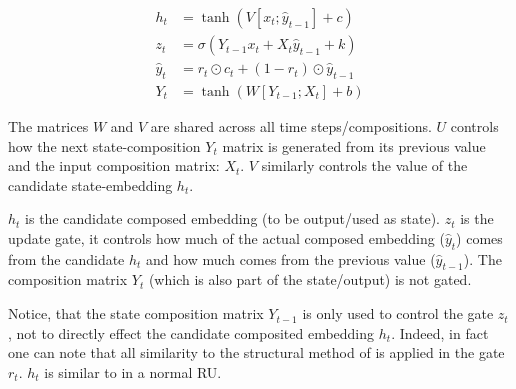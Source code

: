 \documentclass[12pt,parskip]{komatufte}
\begin{document}

 
\begin{align}
h_t &= \tanh\left(V[x_t; \hat{y}_{t-1}] + c \right)\\
z_t &= \sigma\left(Y_{t-1}x_t + X_t \hat{y}_{t-1} + k \right)\\
%
\hat{y}_t &= r_t \odot c_t + (1-r_t) \odot \hat{y}_{t-1} \\
Y_t &= \tanh \left( W[Y_{t-1}; X_t] + b \right)
\end{align}



The matrices $W$ and $V$ are shared across all time steps/compositions.
$U$ controls how the next state-composition $Y_t$ matrix is generated from its previous value and the input composition matrix: $X_t$.
$V$ similarly controls the value of the candidate state-embedding $h_t$.

$h_t$ is the candidate composed embedding (to be output/used as state).
$z_t$ is the update gate, it controls how much of the actual composed embedding ($\hat{y}_t$) comes from the candidate $h_t$ and how much comes from the previous value ($\hat{y}_{t-1}$).
The composition matrix $Y_t$ (which is also part of the state/output) is not gated.

Notice, that the state composition matrix $Y_{t-1}$ is only used to control the gate $z_t$, not to directly effect the candidate composited embedding $h_t$.
Indeed, in fact one can note that all similarity to the structural method of \textcite{SocherMVRNN} is applied in the gate $r_t$.
$h_t$ is similar to in a normal RU.
\end{document}
